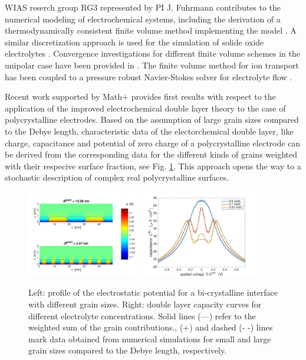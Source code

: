 \documentclass[a4paper,10pt]{article}
\begin{document}
WIAS reserch group RG3 represented by PI J. Fuhrmann contributes to the numerical modeling of electrochemical systems,
including the derivation of a thermodynamically consistent finite volume  method \cite{JF2016} implementing
the model \cite{DGL2014}. A similar discretization approach is used for the simulation
of solide oxide electrolytes \cite{VagnerEtAl2019}. Convergence investigations for different finite volume
schemes in the unipolar case have been  provided in \cite{CCFG2020}. The finite volume method for
ion transport has been coupled to a pressure robust Navier-Stokes solver for electrolyte flow
\cite{FGLMMSpringer2019,FuhrmannEtAlECActa2019}.


Recent work  supported by  Math+  \cite{JES} provides first  results with
respect to the application of the improved electrochemical double layer
theory to the case of polycrystalline  electrodes. Based on the assumption of large
grain sizes compared to the Debye length, characteristic data of the electorchemical double layer,
like charge, capacitance and potential of zero charge of a polycrystalline electrode can be derived from  the corresponding data
for the different kinds of grains weighted with their respecive surface fraction,
see Fig. \ref{fig:JES}. This approach opens the way to
a stochastic description of complex real polycrystalline surfaces.

\begin{figure}
  \centering
  \includegraphics[width=0.45\textwidth]{phi_poly2d_gran.pdf}
  \includegraphics[width=0.45\textwidth]{c_2d_grain.pdf}
  \caption{Left: profile of the electrostatic potential for a bi-crystalline interface with different
    grain sizes.
    Right: double layer capacity curves for different electrolyte concentrations.
    Solid lines (—) refer to the weighted sum of the grain contributions.,
    (+) and dashed (- -) lines mark data obtained from numerical simulations for
    small and large grain sizes compared to the Debye length, respectively.
 \label{fig:JES}}
\end{figure}
\end{document}
